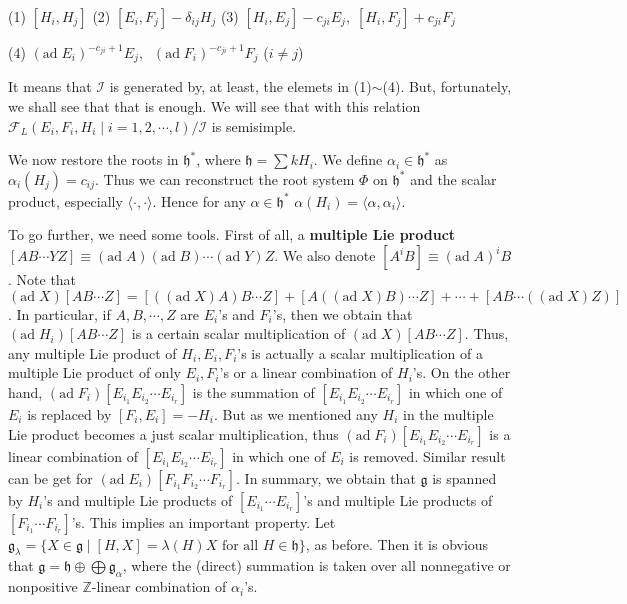 \documentclass{article}
\newcommand{\InZ}{\mathbb{Z}}
\newcommand{\SBar}{\;|\;}
\newcommand{\lie}[1]{\mathfrak{#1}}
\newcommand{\ad}[1]{\mathrm{ad}\; #1}
\begin{document}
(1) $[H_i, H_j]$ \;\; (2) $[E_i, F_j] - \delta_{ij} H_j$ \;\; (3) $[H_i, E_j] - c_{ji} E_j, \; [H_i, F_j] + c_{ji} F_j$

(4) $(\ad{E_i})^{-c_{ji} + 1}E_j, \;\; (\ad{F_i})^{-c_{ji} + 1}F_j$ ($i \ne j$)

It means that $\mathcal{I}$ is generated by, at least, the elemets in (1)$\sim$(4).
But, fortunately, we shall see that that is enough.
We will see that with this relation $\mathcal{F}_L(E_i, F_i, H_i \; | \; i = 1, 2, \cdots, l)/\mathcal{I}$ is semisimple.

We now restore the roots in $\lie{h}^*$, where $\lie{h} = \sum kH_i$.
We define $\alpha_i \in \lie{h}^*$ as $\alpha_i(H_j) = c_{ij}$.
Thus we can reconstruct the root system $\Phi$ on $\lie{h}^*$ and the scalar product, especially $\langle \cdot, \cdot \rangle$.
Hence for any $\alpha \in \lie{h}^*$ $\alpha(H_i) = \langle \alpha, \alpha_i \rangle$.

To go further, we need some tools.
First of all, a \textbf{multiple Lie product} $[AB \cdots YZ] \equiv (\ad{A})(\ad{B}) \cdots (\ad{Y})Z$.
We also denote $[A^i B] \equiv (\ad{A})^i B$.
Note that $(\ad{X})[AB \cdots Z] = [((\ad{X})A)B \cdots Z] + [A((\ad{X})B) \cdots Z] + \cdots + [AB \cdots ((\ad{X})Z)]$.
In particular, if $A, B, \cdots, Z$ are $E_i$'s and $F_i$'s, then we obtain that $(\ad{H_i})[AB \cdots Z]$ is a certain scalar multiplication of $(\ad{X})[AB \cdots Z]$.
Thus, any multiple Lie product of $H_i, E_i, F_i$'s is actually a scalar multiplication of a multiple Lie product of only $E_i, F_i$'s or a linear combination of $H_i$'s.
On the other hand, $(\ad{F_i}) [E_{i_1} E_{i_2} \cdots E_{i_r}]$ is the summation of $[E_{i_1} E_{i_2} \cdots E_{i_r}]$ in which one of $E_i$ is replaced by $[F_i, E_i] = -H_i$.
But as we mentioned any $H_i$ in the multiple Lie product becomes a just scalar multiplication, thus $(\ad{F_i}) [E_{i_1} E_{i_2} \cdots E_{i_r}]$ is a linear combination of $[E_{i_1} E_{i_2} \cdots E_{i_r}]$ in which one of $E_i$ is removed.
Similar result can be get for $(\ad{E_i}) [F_{i_1} F_{i_2} \cdots F_{i_r}]$.
In summary, we obtain that $\lie{g}$ is spanned by $H_i$'s and multiple Lie products of $[E_{i_1} \cdots E_{i_r}]$'s and multiple Lie products of $[F_{i_1} \cdots F_{i_r}]$'s.
This implies an important property.
Let $\lie{g}_\lambda = \{X \in \lie{g} \SBar [H, X] = \lambda(H)X \textrm{ for all $H \in \lie{h}$}\}$, as before.
Then it is obvious that $\lie{g} = \lie{h} \oplus \bigoplus \lie{g}_\alpha$, where the (direct) summation is taken over all nonnegative or nonpositive $\InZ$-linear combination of $\alpha_i$'s.
\end{document}
